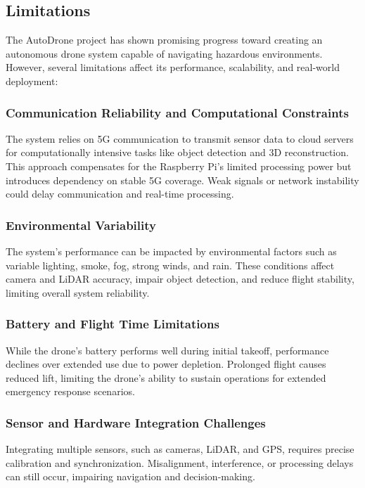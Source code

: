 \documentclass[conference]{IEEEtran}
\begin{document}
\subsection{Limitations}

The AutoDrone project has shown promising progress toward creating an autonomous drone system capable of navigating hazardous environments. However, several limitations affect its performance, scalability, and real-world deployment:

\subsubsection{Communication Reliability and Computational Constraints}
The system relies on 5G communication to transmit sensor data to cloud servers for computationally intensive tasks like object detection and 3D reconstruction. This approach compensates for the Raspberry Pi's limited processing power but introduces dependency on stable 5G coverage. Weak signals or network instability could delay communication and real-time processing.

\subsubsection{Environmental Variability}
The system's performance can be impacted by environmental factors such as variable lighting, smoke, fog, strong winds, and rain. These conditions affect camera and LiDAR accuracy, impair object detection, and reduce flight stability, limiting overall system reliability.

\subsubsection{Battery and Flight Time Limitations}
While the drone's battery performs well during initial takeoff, performance declines over extended use due to power depletion. Prolonged flight causes reduced lift, limiting the drone's ability to sustain operations for extended emergency response scenarios.

\subsubsection{Sensor and Hardware Integration Challenges}
Integrating multiple sensors, such as cameras, LiDAR, and GPS, requires precise calibration and synchronization. Misalignment, interference, or processing delays can still occur, impairing navigation and decision-making.
\end{document}

